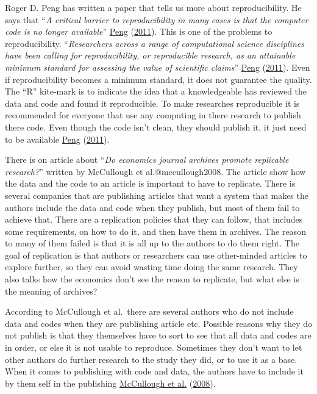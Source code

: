 \documentclass[
  12pt,
  norsk,
]{article}
\begin{document}
Roger D. Peng has written a paper that tells us more about
reproducibility. He says that ``\emph{A critical barrier to
reproducibility in many cases is that the computer code is no longer
available}'' \protect\hyperlink{ref-peng2011}{Peng}
(\protect\hyperlink{ref-peng2011}{2011}). This is one of the problems to
reproducibility. ``\emph{Researchers across a range of computational
science disciplines have been calling for reproducibility, or
reproducible research, as an attainable minimum standard for assessing
the value of scientific claims}'' \protect\hyperlink{ref-peng2011}{Peng}
(\protect\hyperlink{ref-peng2011}{2011}). Even if reproducibility
becomes a minimum standard, it does not guarantee the quality. The ``R''
kite-mark is to indicate the idea that a knowledgeable has reviewed the
data and code and found it reproducible. To make researches reproducible
it is recommended for everyone that use any computing in there research
to publish there code. Even though the code isn't clean, they should
publish it, it just need to be available
\protect\hyperlink{ref-peng2011}{Peng}
(\protect\hyperlink{ref-peng2011}{2011}).

There is on article about ``\emph{Do economics journal archives promote
replicable research?}'' written by McCullough et al.@mccullough2008. The
article show how the data and the code to an article is important to
have to replicate. There is several companies that are publishing
articles that want a system that makes the authors include the data and
code when they publish, but most of them fail to achieve that. There are
a replication policies that they can follow, that includes some
requirements, on how to do it, and then have them in archives. The
reason to many of them failed is that it is all up to the authors to do
them right. The goal of replication is that authors or researchers can
use other-minded articles to explore further, so they can avoid wasting
time doing the same research. They also talks how the economics don't
see the reason to replicate, but what else is the meaning of archives?

According to McCullough et al.~there are several authors who do not
include data and codes when they are publishing article etc. Possible
reasons why they do not publish is that they themselves have to sort to
see that all data and codes are in order, or else it is not usable to
reproduce. Sometimes they don't want to let other authors do further
research to the study they did, or to use it as a base. When it comes to
publishing with code and data, the authors have to include it by them
self in the publishing \protect\hyperlink{ref-mccullough2008}{McCullough
et al.} (\protect\hyperlink{ref-mccullough2008}{2008}).
\end{document}
